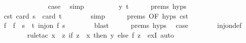 \begin{isabellebody}
\ \ \ \ \isamarkupfalse%
\ {}\isanewline
\ \ \ \ \isamarkupfalse%
\ \isamarkupfalse%
\ {\isacharquery}{\kern0pt}case\ \isamarkupfalse%
\ simp\isanewline
\ \ \isamarkupfalse%
\isanewline
\ \ \ \ \isamarkupfalse%
\ {\isacharparenleft}{\kern0pt}{}\ y\ t{\isacharparenright}{\kern0pt}\isanewline
\ \ \ \ \isamarkupfalse%
\ {\isachardoublequoteopen}{}{\isachardot}{\kern0pt}prems{\isachardoublequoteclose}{\isacharparenleft}{\kern0pt}{}{\isacharcomma}{\kern0pt}{}{\isacharcomma}{\kern0pt}{}{\isacharparenright}{\kern0pt}\ {\isachardoublequoteopen}{}{\isachardot}{\kern0pt}hyps{\isachardoublequoteclose}{\isacharparenleft}{\kern0pt}{}{\isacharcomma}{\kern0pt}{}{\isacharparenright}{\kern0pt}\ \isamarkupfalse%
\ cst{\isacharcolon}{\kern0pt}\ {\isachardoublequoteopen}card\ s\ {\isasymle}\ card\ t{\isachardoublequoteclose}\isanewline
\ \ \ \ \ \ \isamarkupfalse%
\ simp\isanewline
\ \ \ \ \isamarkupfalse%
\ {\isachardoublequoteopen}{}{\isachardot}{\kern0pt}prems{\isachardoublequoteclose}{\isacharparenleft}{\kern0pt}{}{\isacharparenright}{\kern0pt}\ {\isacharbrackleft}{\kern0pt}OF\ {\isachardoublequoteopen}{}{\isachardot}{\kern0pt}hyps{\isachardoublequoteclose}{\isacharparenleft}{\kern0pt}{}{\isacharparenright}{\kern0pt}\ cst{\isacharbrackright}{\kern0pt}\isanewline
\ \ \ \ \isamarkupfalse%
\ f\ \ {\isachardoublequoteopen}f\ {\isacharbackquote}{\kern0pt}\ s\ {\isasymsubseteq}\ t{\isachardoublequoteclose}\ {\isachardoublequoteopen}inj{\isacharunderscore}{\kern0pt}on\ f\ s{\isachardoublequoteclose}\isanewline
\ \ \ \ \ \ \isamarkupfalse%
\ blast\isanewline
\ \ \ \ \isamarkupfalse%
\ {\isachardoublequoteopen}{}{\isachardot}{\kern0pt}prems{\isachardoublequoteclose}{\isacharparenleft}{\kern0pt}{}{\isacharparenright}{\kern0pt}\ {\isachardoublequoteopen}{}{\isachardot}{\kern0pt}hyps{\isachardoublequoteclose}{\isacharparenleft}{\kern0pt}{}{\isacharparenright}{\kern0pt}\ \isamarkupfalse%
\ {\isacharquery}{\kern0pt}case\isanewline
\ \ \ \ \ \ \isamarkupfalse%
\ inj{\isacharunderscore}{\kern0pt}on{\isacharunderscore}{\kern0pt}def\isanewline
\ \ \ \ \ \ \isamarkupfalse%
\ {\isacharparenleft}{\kern0pt}rule{\isacharunderscore}{\kern0pt}tac\ x\ {\isacharequal}{\kern0pt}\ {\isachardoublequoteopen}{\isasymlambda}z{\isachardot}{\kern0pt}\ if\ z\ {\isacharequal}{\kern0pt}\ x\ then\ y\ else\ f\ z{\isachardoublequoteclose}\ \ exI{\isacharparenright}{\kern0pt}\ auto\isanewline

\end{isabellebody}
